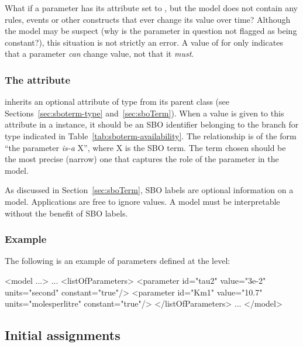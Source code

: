 What if a parameter has its  attribute set to
, but the model does not contain any rules, events or
other constructs that ever change its value over time?  Although
the model may be suspect (why is the parameter in question not
flagged as being constant?), this situation is not strictly an
error.  A value of  for  only indicates
that a parameter \emph{can} change value, not that it \emph{must}.


\subsubsection{The  attribute}
\label{sec:parameter-sboterm}

\Parameter inherits an optional 
attribute of type  from its parent
class \SBase (see Sections~\ref{sec:sboterm-type}
and~\ref{sec:sboTerm}).  When a value is given to this
attribute in a \Parameter instance, it should be an
SBO identifier belonging to the branch for type \Parameter 
indicated in Table~\ref{tab:sboterm-availability}.  The relationship is
of the form ``the parameter \emph{is-a} X'', where X is
the SBO term.  The term chosen should be the most precise (narrow)
one that captures the role of the parameter in the model.

As discussed in Section~\ref{sec:sboTerm}, SBO labels are optional
information on a model.  Applications are free to ignore
 values.  A model must be interpretable without the
benefit of SBO labels.


\subsubsection{Example}

The following is an example of parameters defined at the \Model level:

\begin{example}
<model ...>
    ...
    <listOfParameters>
        <parameter id="tau2" value="3e-2" units="second"        constant="true"/>
        <parameter id="Km1"  value="10.7" units="molesperlitre" constant="true"/>
    </listOfParameters>
    ...
</model>
\end{example}


\subsection{Initial assignments}
\label{sec:initialAssignment}

